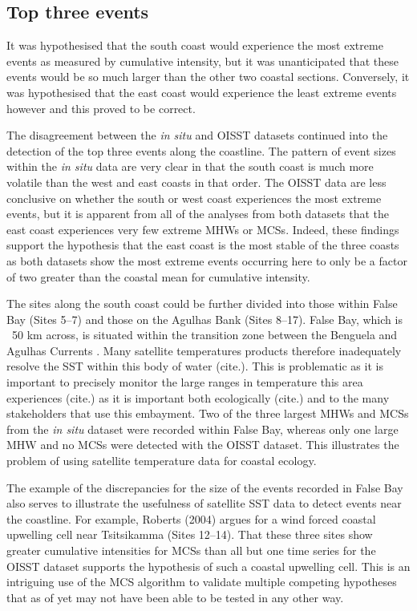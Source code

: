 \documentclass[a4paper,10pt,review]{elsarticle}
\begin{document}
\subsection{Top three events}
It was hypothesised that the south coast would experience the most extreme events as measured by cumulative intensity, but it was unanticipated that these events would be so much larger than the other two coastal sections. Conversely, it was hypothesised that the east coast would experience the least extreme events however and this proved to be correct.

The disagreement between the \emph{in situ} and OISST datasets continued into the detection of the top three events along the coastline. The pattern of event sizes within the \emph{in situ} data are very clear in that the south coast is much more volatile than the west and east coasts in that order. The OISST data are less conclusive on whether the south or west coast experiences the most extreme events, but it is apparent from all of the analyses from both datasets that the east coast experiences very few extreme MHWs or MCSs. Indeed, these findings support the hypothesis that the east coast is the most stable of the three coasts as both datasets show the most extreme events occurring here to only be a factor of two greater than the coastal mean for cumulative intensity.

The sites along the south coast could be further divided into those within False Bay (Sites 5--7) and those on the Agulhas Bank (Sites 8--17). False Bay, which is ~50 km across, is situated within the transition zone between the Benguela and Agulhas Currents \cite{Smit2013}. Many satellite temperatures products therefore inadequately resolve the SST within this body of water (cite.). This is problematic as it is important to precisely monitor the large ranges in temperature this area experiences (cite.) as it is important both ecologically (cite.) and to the many stakeholders that use this embayment. Two of the three largest MHWs and MCSs from the \emph{in situ} dataset were recorded within False Bay, whereas only one large MHW and no MCSs were detected with the OISST dataset. This illustrates the problem of using satellite temperature data for coastal ecology.

The example of the discrepancies for the size of the events recorded in False Bay also serves to illustrate the usefulness of satellite SST data to detect events near the coastline. For example, Roberts (2004) \cite{Roberts2005} argues for a wind forced coastal upwelling cell near Tsitsikamma (Sites 12--14). That these three sites show greater cumulative intensities for MCSs than all but one time series for the OISST dataset supports the hypothesis of such a coastal upwelling cell. This is an intriguing use of the MCS algorithm to validate multiple competing hypotheses that as of yet may not have been able to be tested in any other way.
\end{document}
